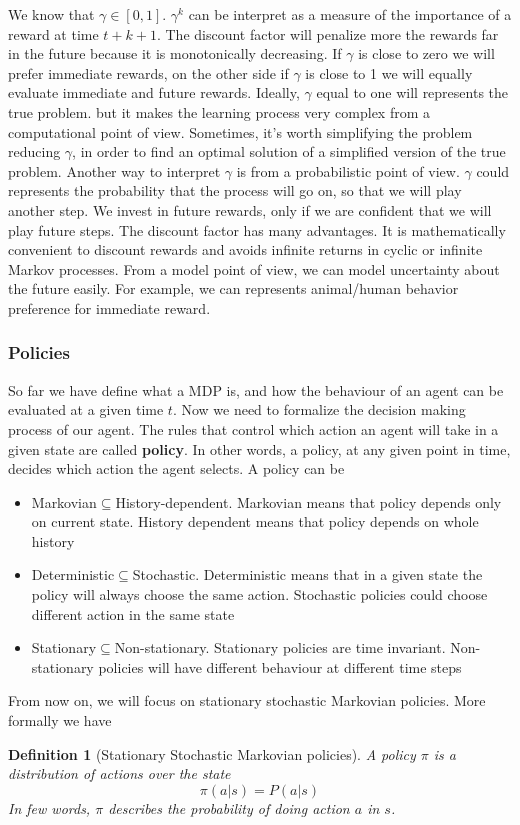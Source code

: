 \documentclass[main.tex]{subfiles}
\newtheorem{definition}{Definition}[section]
\begin{document}
We know that $\gamma \in [0,1]$. $\gamma^k$ can be interpret as a measure of the importance of a reward at time $t+k+1$. The discount factor will penalize more the rewards far in the future because it is monotonically decreasing. If $\gamma$ is close to zero we will prefer immediate rewards, on the other side if $\gamma$ is close to 1 we will equally evaluate immediate and future rewards. Ideally, $\gamma$ equal to one will represents the true problem. but it makes the learning process very complex from a computational point of view. Sometimes, it's worth simplifying the problem reducing $\gamma$, in order to find an optimal solution of a simplified version of the true problem. Another way to interpret $\gamma$ is from a probabilistic point of view. $\gamma$ could represents the probability that the process will go on, so that we will play another step. We invest in future rewards, only if we are confident that we will play future steps. The discount factor has many advantages. It is mathematically convenient to discount rewards and avoids infinite returns in cyclic or infinite Markov processes. From a model point of view, we can model uncertainty about the future easily. For example, we can represents animal/human behavior preference for immediate reward.

\subsubsection{Policies} So far we have define what a MDP is, and how the behaviour of an agent can be evaluated at a given time $t$. Now we need to formalize the decision making process of our agent. The rules that control which action an agent will take in a given state are called \textbf{policy}. In other words, a policy, at any given point in time, decides which action the agent selects. A policy can be
\begin{itemize}
    \item Markovian$\subseteq$History-dependent. Markovian means that policy depends only on current state. History dependent means that policy depends on whole history
    \item Deterministic$\subseteq$Stochastic. Deterministic means that in a given state the policy will always choose the same action. Stochastic policies could choose different action in the same state
    \item Stationary$\subseteq$Non-stationary. Stationary policies are time invariant. Non-stationary policies will have different behaviour at different time steps
\end{itemize}
From now on, we will focus on stationary stochastic Markovian policies. More formally we have
\begin{definition}[Stationary Stochastic Markovian policies]
A policy $\pi$ is a distribution of actions over the state
\begin{equation*}
    \pi(a|s) = P(a|s)
\end{equation*}
In few words, $\pi$ describes the probability of doing action $a$ in $s$.
\end{definition}
\end{document}
